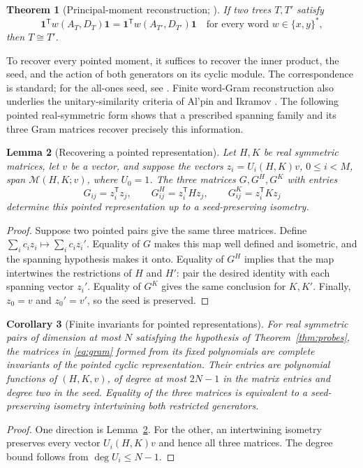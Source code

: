 \documentclass[11pt,letterpaper]{article}
\newtheorem{theorem}{Theorem}[section]
\newtheorem{lemma}[theorem]{Lemma}
\newtheorem{corollary}[theorem]{Corollary}
\theoremstyle{definition}\newtheorem{definition}[theorem]{Definition}
\theoremstyle{remark}\newtheorem{remark}[theorem]{Remark}
\newcommand{\one}{\mathbf1}\newcommand{\M}{\mathcal M}
\begin{document}
\begin{theorem}[Principal-moment reconstruction; {\cite[Theorem 5.4]{LuLi}}]\label{thm:input}
If two trees $T,T'$ satisfy
\[
\one^{\mathsf T}w(A_T,D_T)\one
=\one^{\mathsf T}w(A_{T'},D_{T'})\one
\quad\text{for every word }w\in\{x,y\}^{*},
\]
then $T\cong T'$.
\end{theorem}

To recover every pointed moment, it suffices to recover the inner product,
the seed, and the action of both generators on its cyclic module. The correspondence is
standard; for the all-ones seed, see \cite[Lemma 3.4]{GRS}. Finite word-Gram
reconstruction also underlies the unitary-similarity criteria of Al'pin and
Ikramov \cite[Proposition 10 and Theorem 5]{AlpinIkramov}. The following
pointed real-symmetric form shows that a prescribed spanning family and its
three Gram matrices recover precisely this information.

\begin{lemma}[Recovering a pointed representation]\label{lem:gram}
Let $H,K$ be real symmetric matrices, let $v$ be a vector, and suppose the vectors
$z_i=U_i(H,K)v$, $0\le i<M$, span $\M(H,K;v)$, where $U_0=1$.
The three matrices $G,G^H,G^K$ with entries
\begin{equation}\label{eq:gram}
G_{ij}=z_i^{\mathsf T}z_j,\qquad
G^H_{ij}=z_i^{\mathsf T}Hz_j,\qquad
G^K_{ij}=z_i^{\mathsf T}Kz_j
\end{equation}
determine this pointed representation up to a seed-preserving isometry.
\end{lemma}
\begin{proof}
Suppose two pointed pairs give the same three matrices. Define
$\sum_i c_i z_i\mapsto\sum_i c_i z_i'$.
Equality of $G$ makes this map well defined and isometric, and the spanning
hypothesis makes it onto. Equality of $G^H$ implies that the map intertwines
the restrictions of $H$ and $H'$: pair the desired identity with each spanning
vector $z_i'$. Equality of $G^K$ gives the same conclusion for $K,K'$.
Finally, $z_0=v$ and $z_0'=v'$, so the seed is preserved.
\end{proof}

\begin{corollary}[Finite invariants for pointed representations]\label{cor:pointed}
For real symmetric pairs of dimension at most $N$ satisfying the hypothesis
of Theorem~\ref{thm:probes}, the matrices in \eqref{eq:gram} formed from its
fixed polynomials are complete invariants of the pointed cyclic representation.
Their entries are polynomial functions of $(H,K,v)$, of degree at most $2N-1$
in the matrix entries and degree two in the seed. Equality of the three matrices
is equivalent to a seed-preserving isometry intertwining both restricted generators.
\end{corollary}
\begin{proof}
One direction is Lemma~\ref{lem:gram}. For the other, an intertwining isometry
preserves every vector $U_i(H,K)v$ and hence all three matrices.
The degree bound follows from $\deg U_i\le N-1$.
\end{proof}
\end{document}
